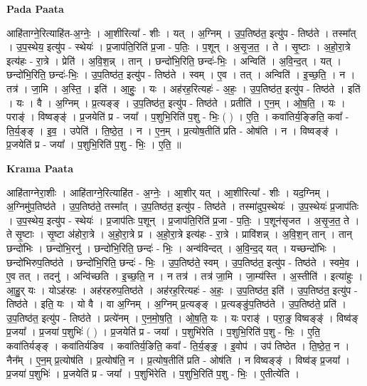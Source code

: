\documentclass[17pt]{extarticle}
\begin{document}
\textbf{Pada Paata} \newline

आहि॑ताग्ने॒रित्याहि॑त-अ॒ग्नेः॒ । आ॒शीरित्या᳚ - शीः । यत् । अ॒ग्निम् । उ॒प॒तिष्ठ॑त॒ इत्यु॑प - तिष्ठ॑ते । तस्मा᳚त् । उ॒प॒स्थेय॒ इत्यु॑प - स्थेयः॑ । प्र॒जाप॑ति॒रिति॑ प्र॒जा - प॒तिः॒ । प॒शून् । अ॒सृ॒ज॒त॒ । ते । सृ॒ष्टाः । अ॒हो॒रा॒त्रे इत्य॑हः - रा॒त्रे । प्रेति॑ । अ॒वि॒श॒न्न् । तान् । छन्दो॑भि॒रिति॒ छन्दः॑-भिः॒ । अन्विति॑ । अ॒वि॒न्द॒त् । यत् । छन्दो॑भि॒रिति॒ छन्दः॑-भिः॒ । उ॒प॒तिष्ठ॑त॒ इत्यु॑प - तिष्ठ॑ते । स्वम् । ए॒व । तत् । अन्विति॑ । इ॒च्छ॒ति॒ । न । तत्र॑ । जा॒मि । अ॒स्ति॒ । इति॑ । आ॒हुः॒ । यः । अह॑रह॒रित्यहः॑ - अ॒हः॒ । उ॒प॒तिष्ठ॑त॒ इत्यु॑प - तिष्ठ॑ते । इति॑ । यः । वै । अ॒ग्निम् । प्र॒त्यङ्ङ् । उ॒प॒तिष्ठ॑त॒ इत्यु॑प - तिष्ठ॑ते । प्रतीति॑ । ए॒न॒म् । ओ॒ष॒ति॒ । यः । पराङ्॑ । विष्वङ्ङ्॑ । प्र॒जयेति॑ प्र - जया᳚ । प॒शुभि॒रिति॑ प॒शु - भिः॒ ( ) । ए॒ति॒ । कवा॑तिर्य॒ङ्ङिति॒ कवा᳚ - ति॒र्य॒ङ्ङ् । इ॒व॒ । उपेति॑ । ति॒ष्ठे॒त॒ । न । ए॒न॒म् । प्र॒त्योष॒तीति॑ प्रति - ओष॑ति । न । विष्वङ्ङ्॑ । प्र॒जयेति॑ प्र - जया᳚ । प॒शुभि॒रिति॑ प॒शु - भिः॒ । ए॒ति॒ ॥  \newline


\textbf{Krama Paata} \newline

आहि॑ताग्नेरा॒शीः । आहि॑ताग्ने॒रित्याहि॑त - अ॒ग्नेः॒ । आ॒शीर् यत् । आ॒शीरित्या᳚ - शीः । यद॒ग्निम् । अ॒ग्निमु॑प॒तिष्ठ॑ते । उ॒प॒तिष्ठ॑ते॒ तस्मा᳚त् । उ॒प॒तिष्ठ॑त॒ इत्यु॑प - तिष्ठ॑ते । तस्मा॑दुप॒स्थेयः॑ । उ॒प॒स्थेयः॑ प्र॒जाप॑तिः । उ॒प॒स्थेय॒ इत्यु॑प - स्थेयः॑ । प्र॒जाप॑तिः प॒शून् । प्र॒जाप॑ति॒रिति॑ प्र॒जा - प॒तिः॒ । प॒शून॑सृजत । अ॒सृ॒ज॒त॒ ते । ते सृ॒ष्टाः । सृ॒ष्टा अ॑होरा॒त्रे । अ॒हो॒रा॒त्रे प्र । अ॒हो॒रा॒त्रे इत्य॑हः - रा॒त्रे । प्रावि॑शन्न् । अ॒वि॒श॒न् तान् । तान् छन्दो॑भिः । छन्दो॑भि॒रनु॑ । छन्दो॑भि॒रिति॒ छन्दः॑ - भिः॒ । अन्व॑विन्दत् । अ॒वि॒न्द॒द् यत् । यच्छन्दो॑भिः । छन्दो॑भिरुप॒तिष्ठ॑ते । छन्दो॑भि॒रिति॒ छन्दः॑ - भिः॒ । उ॒प॒तिष्ठ॑ते॒ स्वम् । उ॒प॒तिष्ठ॑त॒ इत्यु॑प - तिष्ठ॑ते । स्वमे॒व । ए॒व तत् । तदनु॑ । अन्वि॑च्छति । इ॒च्छ॒ति॒ न । न तत्र॑ । तत्र॑ जा॒मि । जा॒म्य॑स्ति । अ॒स्तीति॑ । इत्या॑हुः । आ॒हु॒र् यः । योऽह॑रहः । 
अह॑रहरुप॒तिष्ठ॑ते । अह॑रह॒रित्यहः॑ - अ॒हः॒ । उ॒प॒तिष्ठ॑त॒ इति॑ । उ॒प॒तिष्ठ॑त॒ इत्यु॑प - तिष्ठ॑ते । इति॒ यः । यो वै । वा अ॒ग्निम् । अ॒ग्निम् प्र॒त्यङ्ङ् । प्र॒त्यङ्ङु॑प॒तिष्ठ॑ते । उ॒प॒तिष्ठ॑ते॒ प्रति॑ । उ॒प॒तिष्ठ॑त॒ इत्यु॑प - तिष्ठ॑ते । प्रत्ये॑नम् । ए॒न॒मो॒ष॒ति॒ । ओ॒ष॒ति॒ यः । यः पराङ्॑ । परा॒ङ्॒ विष्वङ्ङ्॑ । विष्व॑ङ् प्र॒जया᳚ । प्र॒जया॑ प॒शुभिः॑ ( ) । प्र॒जयेति॑ प्र - जया᳚ । प॒शुभि॑रेति । प॒शुभि॒रिति॑ प॒शु - भिः॒ । ए॒ति॒ कवा॑तिर्यङ्ङ् । कवा॑तिर्यङिव । कवा॑तिर्य॒ङिति॒ कवा᳚ - ति॒र्य॒ङ्ङ्॒ । इ॒वोप॑ । उप॑ तिष्ठेत । ति॒ष्ठे॒त॒ न । नैन᳚म् । ए॒न॒म् प्र॒त्योष॑ति । प्र॒त्योष॑ति॒ न । प्र॒त्योष॒तीति॑ प्रति - ओष॑ति । न विष्वङ्ङ्॑ । विष्व॑ङ् प्र॒जया᳚ । प्र॒जया॑ प॒शुभिः॑ । प्र॒जयेति॑ प्र - जया᳚ । प॒शुभि॑रेति । प॒शुभि॒रिति॑ प॒शु - भिः॒ । ए॒तीत्ये॑ति । \newline
\end{document}
